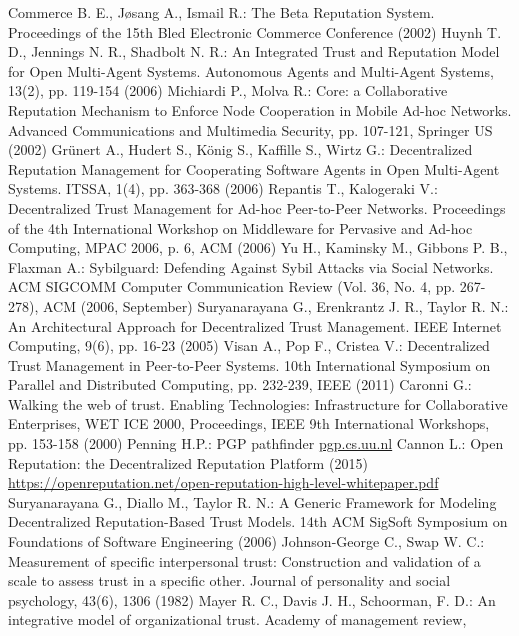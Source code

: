 \begin{thebibliography}{40}
   Commerce B. E., J\o{}sang A., Ismail R.: The Beta Reputation System. Proceedings of the 15th Bled Electronic Commerce
   Conference (2002)
   Huynh T. D., Jennings N. R., Shadbolt N. R.: An Integrated Trust and Reputation Model for Open Multi-Agent Systems.
   Autonomous Agents and Multi-Agent Systems, 13(2), pp. 119-154 (2006)
   Michiardi P., Molva R.: Core: a Collaborative Reputation Mechanism to Enforce Node Cooperation in Mobile Ad-hoc
   Networks. Advanced Communications and Multimedia Security, pp. 107-121, Springer US (2002)
   Gr\"unert A., Hudert S., K\"onig S., Kaffille S., Wirtz G.: Decentralized Reputation Management for Cooperating Software
   Agents in Open Multi-Agent Systems. ITSSA, 1(4), pp. 363-368 (2006)
   Repantis T., Kalogeraki V.: Decentralized Trust Management for Ad-hoc Peer-to-Peer Networks. Proceedings of the 4th
   International Workshop on Middleware for Pervasive and Ad-hoc Computing, MPAC 2006, p. 6, ACM (2006)
   Yu H., Kaminsky M., Gibbons P. B., Flaxman A.: Sybilguard: Defending Against Sybil Attacks via Social Networks. ACM
   SIGCOMM Computer Communication Review (Vol. 36, No. 4, pp. 267-278), ACM (2006, September)
   Suryanarayana G., Erenkrantz J. R., Taylor R. N.: An Architectural Approach for Decentralized Trust Management. IEEE
   Internet Computing, 9(6), pp. 16-23 (2005)
   Visan A., Pop F., Cristea V.: Decentralized Trust Management in Peer-to-Peer Systems. 10th International Symposium on
   Parallel and Distributed Computing, pp. 232-239, IEEE (2011)
   Caronni G.: Walking the web of trust. Enabling Technologies: Infrastructure for Collaborative Enterprises, WET ICE 2000,
   Proceedings, IEEE 9th International Workshops, pp. 153-158 (2000)
   Penning H.P.: PGP pathfinder \url{pgp.cs.uu.nl}
   Cannon L.: Open Reputation: the Decentralized Reputation Platform (2015)
   \url{https://openreputation.net/open-reputation-high-level-whitepaper.pdf}
   Suryanarayana G., Diallo M., Taylor R. N.: A Generic Framework for Modeling Decentralized Reputation-Based Trust Models.
   14th ACM SigSoft Symposium on Foundations of Software Engineering (2006)
   Johnson-George C., Swap W. C.: Measurement of specific interpersonal trust: Construction and validation of a scale to
   assess trust in a specific other. Journal of personality and social psychology, 43(6), 1306 (1982)
   Mayer R. C., Davis J. H., Schoorman, F. D.: An integrative model of organizational trust. Academy of management review,

\end{thebibliography}
